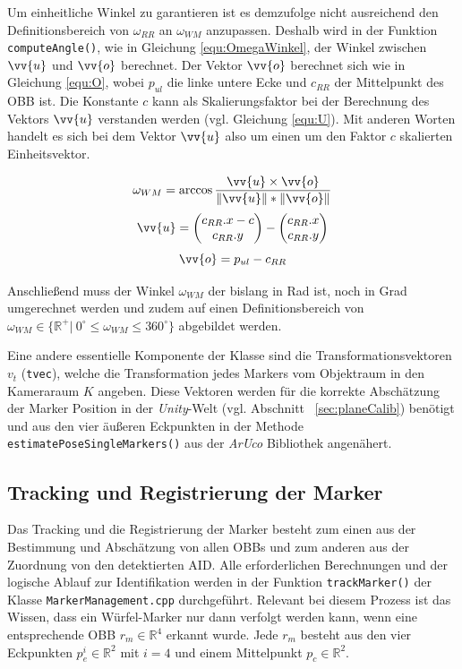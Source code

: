 Um einheitliche Winkel zu garantieren ist es demzufolge nicht ausreichend den Definitionsbereich von $\omega_{RR}$ an $\omega_{WM}$ anzupassen. Deshalb wird in der Funktion \texttt{compute\-Angle()}, wie in Gleichung \ref{equ:OmegaWinkel}, der Winkel zwischen $\vv{u}$ und $\vv{o}$ berechnet. Der Vektor $\vv{o}$ berechnet sich wie in Gleichung \ref{equ:O}, wobei $p_{ul}$ die linke untere Ecke und $c_{RR}$ der Mittelpunkt des OBB ist. Die Konstante $c$ kann als Skalierungsfaktor bei der Berechnung des Vektors $\vv{u}$ verstanden werden (vgl. Gleichung \ref{equ:U}). Mit anderen Worten handelt es sich bei dem Vektor $\vv{u}$ also um einen um den Faktor $c$ skalierten Einheitsvektor.

\begin{equation}
\label{equ:OmegaWinkel}
\omega_{WM} = \arccos \frac{\vv{u} \times \vv{o}}{\|\vv{u}\|*\|\vv{o}\|} 
\end{equation}
\begin{equation}
\label{equ:U}
\vv{u} = \begin{pmatrix}
c_{RR}.x - c\\ c_{RR}.y
\end{pmatrix}
- \begin{pmatrix}
c_{RR}.x\\ c_{RR}.y
\end{pmatrix}
\end{equation}
\begin{equation}
\label{equ:O}
\vv{o}=p_{ul}-c_{RR}
\end{equation}

Anschließend muss der Winkel $\omega_{WM}$ der bislang in Rad ist, noch in Grad umgerechnet werden und zudem auf einen Definitionsbereich von $\omega_{WM} \in \{\mathbb{R}^+ |\ 0 ^\circ \le \omega_{WM} \le 360^\circ\}$ abgebildet werden.


Eine andere essentielle Komponente der Klasse sind die Transformationsvektoren $v_t$ (\texttt{tvec}), welche die Transformation jedes Markers vom Objektraum in den Kameraraum $K$ angeben. Diese Vektoren werden für die korrekte Abschätzung der Marker Position in der \textit{Unity}-Welt (vgl. Abschnitt ~\ref{sec:planeCalib}) benötigt und aus den vier äußeren Eckpunkten in der Methode \texttt{estimate\-Pose\-Single\-Markers()} aus der \textit{ArUco} Bibliothek angenähert. 

\subsection{Tracking und Registrierung der Marker}\label{sec:trackAndReg}
Das Tracking und die Registrierung der Marker besteht zum einen aus der Bestimmung und Abschätzung von allen OBBs und zum anderen aus der Zuordnung von den detektierten AID. Alle erforderlichen Berechnungen und der logische Ablauf zur Identifikation werden in der Funktion \texttt{track\-Marker()} der Klasse \texttt{Marker\-Management.cpp} durchgeführt. Relevant bei diesem Prozess ist das Wissen, dass ein Würfel-Marker nur dann verfolgt werden kann, wenn eine entsprechende OBB $r_m \in \mathbb{R}^4$ erkannt wurde. Jede $r_m$ besteht aus den vier Eckpunkten $p_e^i \in \mathbb{R}^2$ mit $i=4$ und einem Mittelpunkt $p_c \in \mathbb{R}^2$.

